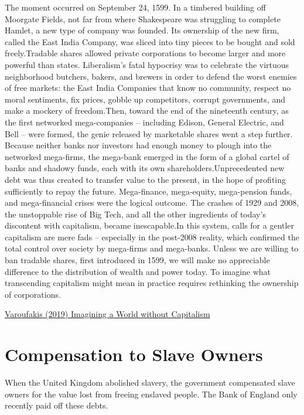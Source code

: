 \documentclass[
]{book}
\begin{document}
The moment occurred on September 24, 1599. In a timbered building off Moorgate Fields, not far from where Shakespeare was struggling to complete Hamlet, a new type of company was founded. Its ownership of the new firm, called the East India Company, was sliced into tiny pieces to be bought and sold freely.Tradable shares allowed private corporations to become larger and more powerful than states. Liberalism's fatal hypocrisy was to celebrate the virtuous neighborhood butchers, bakers, and brewers in order to defend the worst enemies of free markets: the East India Companies that know no community, respect no moral sentiments, fix prices, gobble up competitors, corrupt governments, and make a mockery of freedom.Then, toward the end of the nineteenth century, as the first networked mega-companies -- including Edison, General Electric, and Bell -- were formed, the genie released by marketable shares went a step further. Because neither banks nor investors had enough money to plough into the networked mega-firms, the mega-bank emerged in the form of a global cartel of banks and shadowy funds, each with its own shareholders.Unprecedented new debt was thus created to transfer value to the present, in the hope of profiting sufficiently to repay the future. Mega-finance, mega-equity, mega-pension funds, and mega-financial crises were the logical outcome. The crashes of 1929 and 2008, the unstoppable rise of Big Tech, and all the other ingredients of today's discontent with capitalism, became inescapable.In this system, calls for a gentler capitalism are mere fads -- especially in the post-2008 reality, which confirmed the total control over society by mega-firms and mega-banks. Unless we are willing to ban tradable shares, first introduced in 1599, we will make no appreciable difference to the distribution of wealth and power today. To imagine what transcending capitalism might mean in practice requires rethinking the ownership of corporations.

\href{https://www.project-syndicate.org/commentary/imagining-a-world-without-capitalism-by-yanis-varoufakis-2019-12}{Varoufakis (2019) Imagining a World without Capitalism}

\hypertarget{compensation-to-slave-owners}{%
\section{Compensation to Slave Owners}\label{compensation-to-slave-owners}}

When the United Kingdom abolished slavery, the government compensated slave owners for the value lost from freeing enslaved people. The Bank of England only recently paid off these debts.
\end{document}

